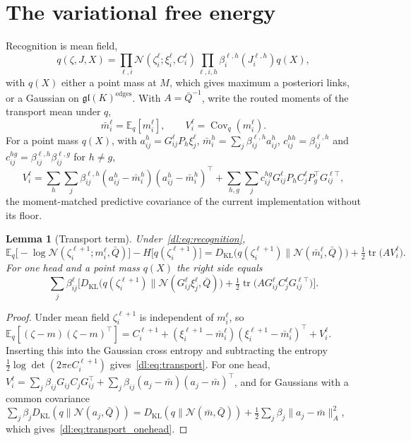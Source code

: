 \documentclass[11pt]{article}
\newtheorem{lemma}[theorem]{Lemma}
\theoremstyle{definition}
\theoremstyle{remark}
\providecommand{\gl}{\mathfrak{gl}}
\providecommand{\tr}{\operatorname{tr}}
\providecommand{\KL}{D_{\mathrm{KL}}}
\newcommand{\E}{\mathbb E}
\newcommand{\N}{\mathcal N}
\newcommand{\Qb}{\bar Q}
\begin{document}
\section{The variational free energy}
\label{dl:sec:vfe}

Recognition is mean field,
\begin{equation}
q(\zeta,J,X)=\prod_{\ell,i}\N(\zeta_i^\ell;\xi_i^\ell,C_i^\ell)\prod_{\ell,i,h}\beta_i^{\ell,h}(J_i^{\ell,h})q(X),
\label{dl:eq:recognition}
\end{equation}
with $q(X)$ either a point mass at $M$, which gives maximum a posteriori links, or a Gaussian on $\gl(K)^{\text{edges}}$. With $A=\Qb^{-1}$, write the routed moments of the transport mean under $q$,
\begin{equation}
\bar m_i^\ell=\E_q[m_i^\ell],\qquad V_i^\ell=\operatorname{Cov}_q(m_i^\ell).
\label{dl:eq:moments}
\end{equation}
For a point mass $q(X)$, with $a_{ij}^h=G_{ij}^\ell P_h\xi_j^\ell$, $\bar m_i^h=\sum_j\beta_{ij}^{\ell,h}a_{ij}^h$, $c^{hh}_{ij}=\beta^{\ell,h}_{ij}$ and $c^{hg}_{ij}=\beta^{\ell,h}_{ij}\beta^{\ell,g}_{ij}$ for $h\ne g$,
\begin{equation}
V_i^\ell=\sum_h\sum_j\beta_{ij}^{\ell,h}(a_{ij}^h-\bar m_i^h)(a_{ij}^h-\bar m_i^h)^\top+\sum_{h,g}\sum_jc^{hg}_{ij}G_{ij}^\ell P_hC_j^\ell P_g^\top G_{ij}^{\ell\top},
\label{dl:eq:V}
\end{equation}
the moment-matched predictive covariance of the current implementation without its floor.

\begin{lemma}[Transport term]
\label{dl:lem:transport}
Under~\eqref{dl:eq:recognition},
\begin{equation}
\E_q\big[-\log\N(\zeta_i^{\ell+1};m_i^\ell,\Qb)\big]-H\big[q(\zeta_i^{\ell+1})\big]
=\KL\big(q(\zeta_i^{\ell+1})\|\N(\bar m_i^\ell,\Qb)\big)+\tfrac12\tr\big(AV_i^\ell\big).
\label{dl:eq:transport}
\end{equation}
For one head and a point mass $q(X)$ the right side equals
\begin{equation}
\sum_j\beta_{ij}^\ell\Big[\KL\big(q(\zeta_i^{\ell+1})\|\N(G_{ij}^\ell\xi_j^\ell,\Qb)\big)+\tfrac12\tr\big(AG_{ij}^\ell C_j^\ell G_{ij}^{\ell\top}\big)\Big].
\label{dl:eq:transport_onehead}
\end{equation}
\end{lemma}

\begin{proof}
Under mean field $\zeta_i^{\ell+1}$ is independent of $m_i^\ell$, so $\E_q[(\zeta-m)(\zeta-m)^\top]=C_i^{\ell+1}+(\xi_i^{\ell+1}-\bar m_i^\ell)(\xi_i^{\ell+1}-\bar m_i^\ell)^\top+V_i^\ell$. Inserting this into the Gaussian cross entropy and subtracting the entropy $\tfrac12\log\det(2\pi eC_i^{\ell+1})$ gives~\eqref{dl:eq:transport}. For one head, $V_i^\ell=\sum_j\beta_{ij}G_{ij}C_jG_{ij}^\top+\sum_j\beta_{ij}(a_j-\bar m)(a_j-\bar m)^\top$, and for Gaussians with a common covariance $\sum_j\beta_j\KL(q\|\N(a_j,\Qb))=\KL(q\|\N(\bar m,\Qb))+\tfrac12\sum_j\beta_j\|a_j-\bar m\|_A^2$, which gives~\eqref{dl:eq:transport_onehead}.
\end{proof}
\end{document}
